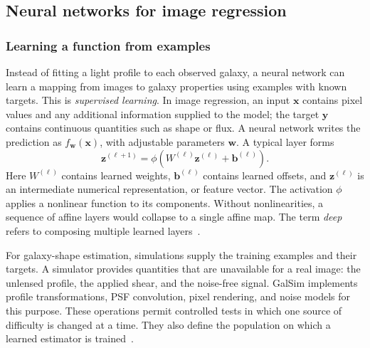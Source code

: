 \subsection{Neural networks for image regression}
\label{sec:learning}

\subsubsection{Learning a function from examples}


Instead of fitting a light profile to each observed galaxy, a neural network can learn a mapping from images to galaxy properties using examples with known targets. This is \emph{supervised learning}. In image regression, an input $\boldsymbol{x}$ contains pixel values and any additional information supplied to the model; the target $\boldsymbol{y}$ contains continuous quantities such as shape or flux. A neural network writes the prediction as $f_{\boldsymbol{w}}(\boldsymbol{x})$, with adjustable parameters $\boldsymbol{w}$. A typical layer forms
\begin{equation}
    \boldsymbol{z}^{(\ell+1)}=
    \phi\!\left(W^{(\ell)}\boldsymbol{z}^{(\ell)}+\boldsymbol{b}^{(\ell)}\right).
    \label{eq:network-layer}
\end{equation}
Here $W^{(\ell)}$ contains learned weights, $\boldsymbol{b}^{(\ell)}$ contains learned offsets, and $\boldsymbol{z}^{(\ell)}$ is an intermediate numerical representation, or feature vector. The activation $\phi$ applies a nonlinear function to its components. Without nonlinearities, a sequence of affine layers would collapse to a single affine map. The term \emph{deep} refers to composing multiple learned layers~\cite{goodfellow_deep_2016}.

For galaxy-shape estimation, simulations supply the training examples and their targets. A simulator provides quantities that are unavailable for a real image: the unlensed profile, the applied shear, and the noise-free signal. GalSim implements profile transformations, PSF convolution, pixel rendering, and noise models for this purpose. These operations permit controlled tests in which one source of difficulty is changed at a time. They also define the population on which a learned estimator is trained~\cite{rowe_galsim_2015}.

